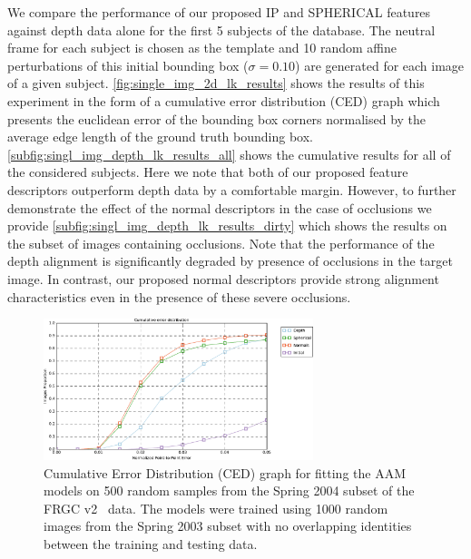 We compare the performance of our proposed IP and SPHERICAL features against
depth data alone for the first 5 subjects of the database. The neutral frame
for each subject is chosen as the template and 10 random affine perturbations
of this initial bounding box ($\sigma = 0.10$) are generated for each image
of a given subject.
\cref{fig:single_img_2d_lk_results} shows the results of this experiment in
the form of a cumulative error distribution (CED) graph which presents
the euclidean error of the bounding box corners normalised by the
average edge length of the ground truth bounding box.
\cref{subfig:singl_img_depth_lk_results_all} shows the cumulative results for
all of the considered subjects. Here we note that both of our proposed
feature descriptors outperform depth data by a comfortable margin. However,
to further demonstrate the effect of the normal descriptors in the case of
occlusions we provide \cref{subfig:singl_img_depth_lk_results_dirty} which
shows the results on the subset of images containing occlusions. Note that
the performance of the depth alignment is significantly degraded by presence
of occlusions in the target image. In contrast, our proposed normal descriptors
provide strong alignment characteristics even in the presence of these
severe occlusions.
\begin{figure}[t]
    \centering
    \includegraphics[width=0.7\textwidth]{statistical_normals/images/lk2d/aam_fgrc_500_random}
    \caption{Cumulative Error Distribution (CED) graph for fitting the AAM
             models on 500 random samples from the Spring 2004 subset of the
             FRGC v2~\cite{phillips2005overview} data. The models were trained
             using 1000 random images from the Spring 2003 subset with no
             overlapping identities between the training and testing data.}
\label{fig:single_img_aam_results}
\end{figure}
\setlength{\tabcolsep}{2pt}
